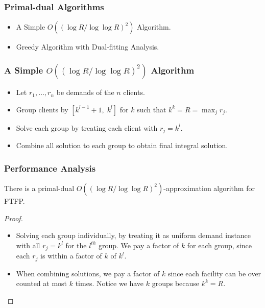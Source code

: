 \documentclass[handout, hyperref, xcolor=dvipsnames]{beamer}
\begin{document}
\begin{frame}
  \frametitle{Primal-dual Algorithms}
  \begin{itemize}
  \item A Simple $O((\log R/\log\log R)^2)$ Algorithm.
  \item Greedy Algorithm with Dual-fitting Analysis.
  \end{itemize}
\end{frame}

\begin{frame}
  \frametitle{A Simple $O((\log R/\log\log R)^2)$ Algorithm}
  \begin{itemize}
  \item Let $r_1,\ldots, r_n$ be demands of the $n$ clients.
  \item Group clients by $[k^{l-1}+1,\; k^l]$ for $k$ such that $k^k = R =
    \max_j r_j$.
  \item Solve each group by treating each client with
    $r_j=k^l$.
  \item Combine all solution to each group to obtain final integral
    solution.
  \end{itemize}
\end{frame}

\begin{frame}
  \frametitle{Performance Analysis}
  \begin{theorem}
    There is a primal-dual $O((\log R /\log\log R)^2)$-approximation
    algorithm for FTFP.
  \end{theorem}
  \begin{proof}
    \begin{itemize}
    \item Solving each group individually, by treating it as uniform
      demand instance with all $r_j = k^l$ for the $l^{th}$ group. We
      pay a factor of $k$ for each group, since each $r_j$ is within a
      factor of $k$ of $k^l$.
    \item When combining solutions, we pay a factor of $k$ since each
      facility can be over counted at most $k$ times. Notice we have
      $k$ groups because $k^k = R$.
    \end{itemize}
  \end{proof}
\end{frame}
\end{document}

